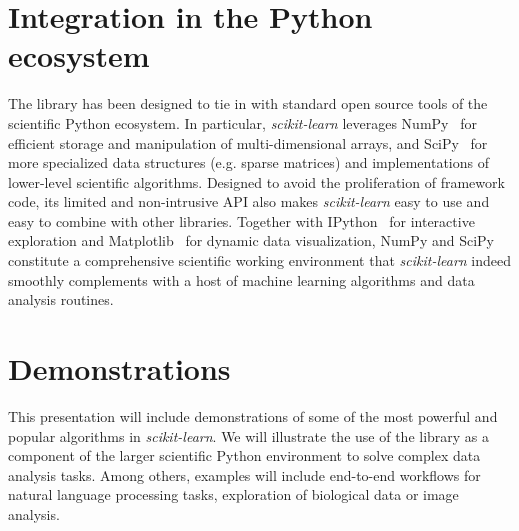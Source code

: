 \documentclass{article}
\newcommand{\sklearn}{\textit{scikit-learn}\xspace}
\DeclareRobustCommand{\VAN}[3]{#2}
\begin{document}
\section*{Integration in the Python ecosystem}

The library has been designed to tie in with standard  open source tools of the
scientific Python ecosystem. In particular, \sklearn leverages
NumPy~\citep{vanderwalt2011} for efficient storage and manipulation of
multi-dimensional arrays, and SciPy~\citep{oliphant2007python} for more specialized
data structures  (e.g. sparse matrices) and implementations of lower-level
scientific algorithms. Designed to avoid the proliferation of framework code,
its limited and non-intrusive API also makes \sklearn easy to use and easy to
combine with other libraries. Together with IPython~\citep{perez2007ipython}
for interactive exploration and Matplotlib~\citep{hunter2007matplotlib} for
dynamic data visualization, NumPy and SciPy constitute a comprehensive
scientific working environment that \sklearn indeed smoothly complements with a
host of machine learning algorithms and data analysis routines.


\section*{Demonstrations}

This presentation will include demonstrations of some of the most powerful and
popular algorithms in \sklearn. We will illustrate the use of the
library as a component of the larger scientific Python environment to solve
complex data analysis tasks. Among others, examples will include end-to-end
workflows for natural language processing tasks, exploration of biological data
or image analysis.


{\small

\DeclareRobustCommand{\VAN}[3]{#3}
\setlength{\bibsep}{1mm}

}
\end{document}

